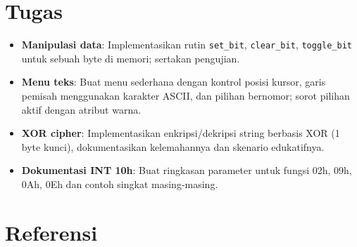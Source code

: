 \section{Tugas}
\begin{itemize}
  \item \textbf{Manipulasi data}: Implementasikan rutin \texttt{set\_bit}, \texttt{clear\_bit}, \texttt{toggle\_bit} untuk sebuah byte di memori; sertakan pengujian.
  \item \textbf{Menu teks}: Buat menu sederhana dengan kontrol posisi kursor, garis pemisah menggunakan karakter ASCII, dan pilihan bernomor; sorot pilihan aktif dengan atribut warna.
  \item \textbf{XOR cipher}: Implementasikan enkripsi/dekripsi string berbasis XOR (1 byte kunci), dokumentasikan kelemahannya dan skenario edukatifnya.
  \item \textbf{Dokumentasi INT 10h}: Buat ringkasan parameter untuk fungsi 02h, 09h, 0Ah, 0Eh dan contoh singkat masing-masing.
\end{itemize}

\section{Referensi}
